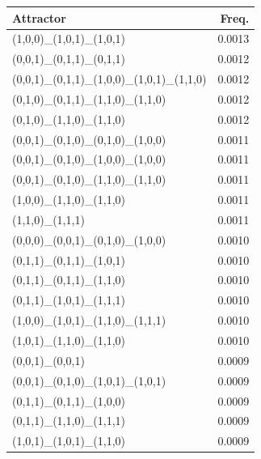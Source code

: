 \documentclass[11pt]{article}
\begin{document}
\begin{minipage}[t]{0.45\linewidth}
\begin{tabular}{@{}lr@{}}
\toprule
Attractor & Freq.\\
\midrule
(1,0,0)\_(1,0,1)\_(1,0,1)                         & 0.0013 \\
(0,0,1)\_(0,1,1)\_(0,1,1)                         & 0.0012 \\
(0,0,1)\_(0,1,1)\_(1,0,0)\_(1,0,1)\_(1,1,0)      & 0.0012 \\
(0,1,0)\_(0,1,1)\_(1,1,0)\_(1,1,0)                & 0.0012 \\
(0,1,0)\_(1,1,0)\_(1,1,0)                         & 0.0012 \\
(0,0,1)\_(0,1,0)\_(0,1,0)\_(1,0,0)                & 0.0011 \\
(0,0,1)\_(0,1,0)\_(1,0,0)\_(1,0,0)                & 0.0011 \\
(0,0,1)\_(0,1,0)\_(1,1,0)\_(1,1,0)                & 0.0011 \\
(1,0,0)\_(1,1,0)\_(1,1,0)                         & 0.0011 \\
(1,1,0)\_(1,1,1)                                   & 0.0011 \\
(0,0,0)\_(0,0,1)\_(0,1,0)\_(1,0,0)                & 0.0010 \\
(0,1,1)\_(0,1,1)\_(1,0,1)                         & 0.0010 \\
(0,1,1)\_(0,1,1)\_(1,1,0)                         & 0.0010 \\
(0,1,1)\_(1,0,1)\_(1,1,1)                         & 0.0010 \\
(1,0,0)\_(1,0,1)\_(1,1,0)\_(1,1,1)                & 0.0010 \\
(1,0,1)\_(1,1,0)\_(1,1,0)                         & 0.0010 \\
(0,0,1)\_(0,0,1)                                   & 0.0009 \\
(0,0,1)\_(0,1,0)\_(1,0,1)\_(1,0,1)                & 0.0009 \\
(0,1,1)\_(0,1,1)\_(1,0,0)                         & 0.0009 \\
(0,1,1)\_(1,1,0)\_(1,1,1)                         & 0.0009 \\
(1,0,1)\_(1,0,1)\_(1,1,0)                         & 0.0009 \\
\bottomrule
\end{tabular}
\end{minipage}
\end{document}
